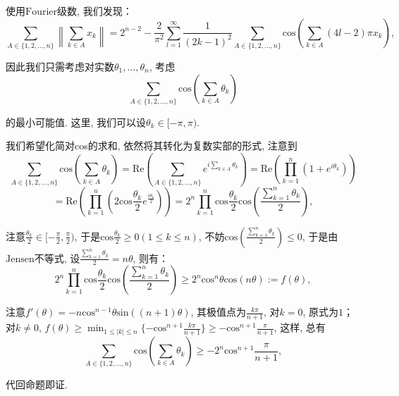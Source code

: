 \documentclass[lang=cn,12pt,thmcnt=section]{elegantbook}
\begin{document}
\begin{analysis}
使用$\mathrm{Fourier}$级数, 我们发现：
\[
\sum_{ A\in\{1,2,\dots{},n\}}\left\lVert\sum_{k\in A}x_k\right\rVert=2^{n-2}-\frac{2}{\pi^2}\sum_{l=1}^\infty\frac{1}{(2k-1)^2}\sum_{ A\in\{1,2,\dots{},n\}}\mathrm{cos}\left(\sum_{k\in A}(4l-2)\pi x_k\right),
\]

因此我们只需考虑对实数$\theta_1,\dots{},\theta_n$, 考虑
\[
\sum_{ A\in\{1,2,\dots{},n\}}\mathrm{cos}\left(\sum_{k\in A}\theta_k\right)
\]

的最小可能值. 这里, 我们可以设$\theta_{k}\in [-\pi,\pi)$.

我们希望化简对cos的求和, 依然将其转化为复数实部的形式, 注意到
\[
\sum_{ A\in\{1,2,\dots{},n\}}\mathrm{cos}\left(\sum_{k\in A}\theta_k\right)=\mathrm{Re}\left(\sum_{ A\in\{1,2,\dots{},n\}}e^{i\sum_{k\in A}\theta_k}\right)=\mathrm{Re}\left(\prod_{k=1}^n (1+e^{i\theta_k})\right)
\]
\[
=\mathrm{Re}\left(\prod_{k=1}^n (2\mathrm{cos}\frac{\theta_k}{2}e^{\frac{i\theta_k}{2}})\right)=2^n\prod_{k=1}^n \mathrm{cos}\frac{\theta_k}{2}\mathrm{cos}\left(\frac{\sum_{k=1}^n \theta_k}{2}\right),
\]

注意$\frac{\theta_k}{2}\in[-\frac{\pi}{2},\frac{\pi}{2})$, 于是$\mathrm{cos}\frac{\theta_k}{2}\ge 0(1\le k\le n)$, 不妨$\mathrm{cos}\left(\frac{\sum_{k=1}^n \theta_k}{2}\right)\le 0$, 于是由$\mathrm{Jensen}$不等式, 设$\frac{\sum_{k=1}^n \theta_k}{2}=n\theta$, 则有：
\[
2^n\prod_{k=1}^n \mathrm{cos}\frac{\theta_k}{2}\mathrm{cos}\left(\frac{\sum_{k=1}^n \theta_k}{2}\right)\ge 2^n\mathrm{cos}^n\theta\mathrm{cos}(n\theta):=f(\theta),
\]

注意$f'(\theta)=-n\mathrm{cos}^{n-1}\theta\mathrm{sin}((n+1)\theta)$, 其极值点为$\frac{k\pi}{n+1}$, 对$k=0$, 原式为$1$；对$k\ne 0$, $f(\theta)\ge \min_{1\le |k|\le n}\{-\mathrm{cos}^{n+1}\frac{k\pi}{n+1}\}\ge -\mathrm{cos}^{n+1}\frac{\pi}{n+1}$, 这样, 总有
\[
\sum_{ A\in\{1,2,\dots{},n\}}\mathrm{cos}\left(\sum_{k\in A}\theta_k\right)\ge -2^n\mathrm{cos}^{n+1}\frac{\pi}{n+1},
\]

代回命题即证.
\end{analysis}
\end{document}
